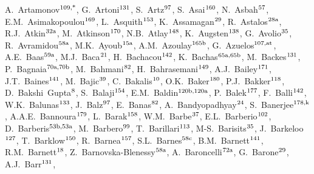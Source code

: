 \begin{flushleft}
A.~Artamonov$^\textrm{\scriptsize 109,*}$,    
G.~Artoni$^\textrm{\scriptsize 131}$,    
S.~Artz$^\textrm{\scriptsize 97}$,    
S.~Asai$^\textrm{\scriptsize 160}$,    
N.~Asbah$^\textrm{\scriptsize 57}$,    
E.M.~Asimakopoulou$^\textrm{\scriptsize 169}$,    
L.~Asquith$^\textrm{\scriptsize 153}$,    
K.~Assamagan$^\textrm{\scriptsize 29}$,    
R.~Astalos$^\textrm{\scriptsize 28a}$,    
R.J.~Atkin$^\textrm{\scriptsize 32a}$,    
M.~Atkinson$^\textrm{\scriptsize 170}$,    
N.B.~Atlay$^\textrm{\scriptsize 148}$,    
K.~Augsten$^\textrm{\scriptsize 138}$,    
G.~Avolio$^\textrm{\scriptsize 35}$,    
R.~Avramidou$^\textrm{\scriptsize 58a}$,    
M.K.~Ayoub$^\textrm{\scriptsize 15a}$,    
A.M.~Azoulay$^\textrm{\scriptsize 165b}$,    
G.~Azuelos$^\textrm{\scriptsize 107,at}$,    
A.E.~Baas$^\textrm{\scriptsize 59a}$,    
M.J.~Baca$^\textrm{\scriptsize 21}$,    
H.~Bachacou$^\textrm{\scriptsize 142}$,    
K.~Bachas$^\textrm{\scriptsize 65a,65b}$,    
M.~Backes$^\textrm{\scriptsize 131}$,    
P.~Bagnaia$^\textrm{\scriptsize 70a,70b}$,    
M.~Bahmani$^\textrm{\scriptsize 82}$,    
H.~Bahrasemani$^\textrm{\scriptsize 149}$,    
A.J.~Bailey$^\textrm{\scriptsize 171}$,    
J.T.~Baines$^\textrm{\scriptsize 141}$,    
M.~Bajic$^\textrm{\scriptsize 39}$,    
C.~Bakalis$^\textrm{\scriptsize 10}$,    
O.K.~Baker$^\textrm{\scriptsize 180}$,    
P.J.~Bakker$^\textrm{\scriptsize 118}$,    
D.~Bakshi~Gupta$^\textrm{\scriptsize 8}$,    
S.~Balaji$^\textrm{\scriptsize 154}$,    
E.M.~Baldin$^\textrm{\scriptsize 120b,120a}$,    
P.~Balek$^\textrm{\scriptsize 177}$,    
F.~Balli$^\textrm{\scriptsize 142}$,    
W.K.~Balunas$^\textrm{\scriptsize 133}$,    
J.~Balz$^\textrm{\scriptsize 97}$,    
E.~Banas$^\textrm{\scriptsize 82}$,    
A.~Bandyopadhyay$^\textrm{\scriptsize 24}$,    
S.~Banerjee$^\textrm{\scriptsize 178,k}$,    
A.A.E.~Bannoura$^\textrm{\scriptsize 179}$,    
L.~Barak$^\textrm{\scriptsize 158}$,    
W.M.~Barbe$^\textrm{\scriptsize 37}$,    
E.L.~Barberio$^\textrm{\scriptsize 102}$,    
D.~Barberis$^\textrm{\scriptsize 53b,53a}$,    
M.~Barbero$^\textrm{\scriptsize 99}$,    
T.~Barillari$^\textrm{\scriptsize 113}$,    
M-S.~Barisits$^\textrm{\scriptsize 35}$,    
J.~Barkeloo$^\textrm{\scriptsize 127}$,    
T.~Barklow$^\textrm{\scriptsize 150}$,    
R.~Barnea$^\textrm{\scriptsize 157}$,    
S.L.~Barnes$^\textrm{\scriptsize 58c}$,    
B.M.~Barnett$^\textrm{\scriptsize 141}$,    
R.M.~Barnett$^\textrm{\scriptsize 18}$,    
Z.~Barnovska-Blenessy$^\textrm{\scriptsize 58a}$,    
A.~Baroncelli$^\textrm{\scriptsize 72a}$,    
G.~Barone$^\textrm{\scriptsize 29}$,    
A.J.~Barr$^\textrm{\scriptsize 131}$,    

\end{flushleft}
